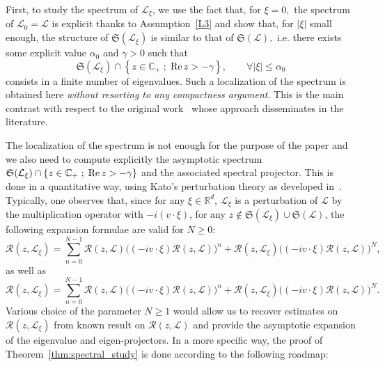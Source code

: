 \documentclass[10pt]{amsart}
\theoremstyle{definition}\newtheorem{defi}[theo]{Definition}\newtheorem{rema}[theo]{Remark}\newtheorem{exam}[theo]{Example}\newtheorem{exem}[theo]{Example}\newtheorem{nota}[theo]{Notation}
\newcommand{\re}{\mathrm{Re}\,}
\newcommand{\R}{\mathbb{R}}
\newcommand{\C}{\mathbb{C}}
\newcommand{\fkS}{\mathfrak{S}}
\newcommand{\LL}{\mathcal{L}}
\newcommand{\RR}{\mathcal{R}}
\renewcommand*\le{\leqslant}
\renewcommand*\ge{\geqslant}
\renewcommand*\geq{\geqslant}
\let\oldforall\forall
\renewcommand*{\forall}{\mathrel{\oldforall}}
\begin{document}
First, to study the spectrum of $\LL_{\xi}$, we use the fact that, for $\xi=0,$ the spectrum of $\LL_{0}=\LL$ is explicit thanks to Assumption~\eqref{L3} and show that, for $|\xi|$ small enough, the structure of $\fkS(\LL_{\xi})$ is similar to that of $\fkS(\LL),$ i.e. there exists some explicit value $\alpha_{0}$ and $\gamma >0$ such that
\[
\fkS(\LL_{\xi}) \cap \left\{z \in \C_{+}\;;\;\re z >-\gamma\right\}, \qquad \forall |\xi | \le \alpha_0
\]
consists in a finite number of eigenvalues. Such a localization of the spectrum is obtained here \emph{without resorting to any compactness argument}. This is the main contrast with respect to the original work~\cite{EP1975} whose approach disseminates in the literature.

The localization of the spectrum is not enough for the purpose of the paper and we also need to compute explicitly {the asymptotic spectrum $\fkS(\LL_{\xi}) \cap \{z \in \C_{+}\;;\;\re z >\linebreak -\gamma\}$ and the associated spectral projector}. This is done in a quantitative way, using Kato's perturbation theory as developed in~\cite{K1995}. Typically, one observes that, since for any $\xi \in \R^{d}$, $\LL_{\xi}$ is a perturbation of $\LL$ by the multiplication operator with $-i(v\cdot \xi)$, for any $z \notin \fkS(\LL_{\xi}) \cup \fkS(\LL)$, the following expansion formulae are valid for $N \ge 0$:
\begin{equation}\label{eq:factorization_L_ivxi_left}
\RR(z,\LL_{\xi}) = \sum_{n = 0}^{N-1} \RR(z,\LL) \Big((- i v \cdot \xi) \RR(z,\LL)\Big)^n + \RR(z,\LL_{\xi}) \Big((- i v \cdot \xi) \RR(z,\LL)\Big)^N,
\end{equation}
as well as
\begin{equation}\label{eq:factorization_L_ivxi_right}
\RR(z,\LL_{\xi}) = \sum_{n = 0}^{N-1} \RR(z,\LL) \Big((- i v \cdot \xi) \RR(z,\LL)\Big)^n + \RR(z,\LL_{\xi}) \Big((- i v \cdot \xi) \RR(z,\LL)\Big)^N.
\end{equation}
Various choice of the parameter $N\geq1$ would allow us to recover estimates on $\RR(z,\LL_{\xi})$ from known result on $\RR(z,\LL)$ and provide the asymptotic expansion of the eigenvalue and eigen-projectors. In a more specific way, the proof of Theorem~\ref{thm:spectral_study} is done according to the following roadmap:
\end{document}
